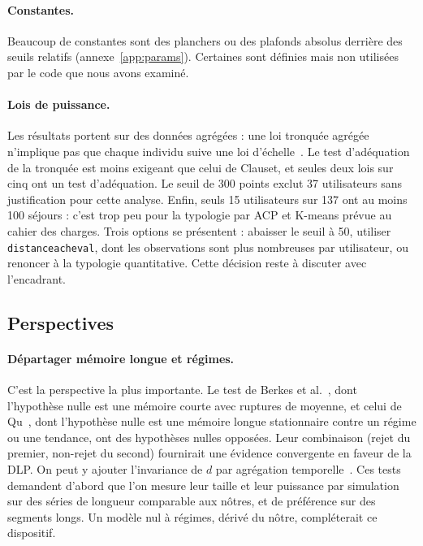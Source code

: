 \documentclass[11pt,a4paper]{article}
\newcommand{\code}[1]{\texttt{#1}}
\renewcommand{\_}{\textunderscore\penalty0\hspace{0pt}}
\begin{document}
\paragraph{Constantes.} Beaucoup de constantes sont des planchers ou des plafonds absolus
derrière des seuils relatifs (annexe~\ref{app:params}). Certaines sont définies mais non
utilisées par le code que nous avons examiné.

\paragraph{Lois de puissance.} Les résultats portent sur des données agrégées : une loi
tronquée agrégée n'implique pas que chaque individu suive une loi d'échelle~\cite{yan2013}.
Le test d'adéquation de la tronquée est moins exigeant que celui de Clauset, et seules deux
lois sur cinq ont un test d'adéquation. Le seuil de 300 points exclut 37 utilisateurs sans
justification pour cette analyse. Enfin, seuls 15 utilisateurs sur 137 ont au moins 100
séjours : c'est trop peu pour la typologie par ACP et K-means prévue au cahier des charges.
Trois options se présentent : abaisser le seuil à 50, utiliser \code{distance\_a\_cheval},
dont les observations sont plus nombreuses par utilisateur, ou renoncer à la typologie
quantitative. Cette décision reste à discuter avec l'encadrant.

\subsection{Perspectives}
\label{sec:perspectives}

\paragraph{Départager mémoire longue et régimes.} C'est la perspective la plus importante.
Le test de Berkes et al.~\cite{berkes2006}, dont l'hypothèse nulle est une mémoire courte avec
ruptures de moyenne, et celui de Qu~\cite{qu2011}, dont l'hypothèse nulle est une mémoire
longue stationnaire contre un régime ou une tendance, ont des hypothèses nulles opposées.
Leur combinaison (rejet du premier, non-rejet du second) fournirait une évidence convergente
en faveur de la DLP. On peut y ajouter l'invariance de $d$ par agrégation
temporelle~\cite{ohanissian2008}. Ces tests demandent d'abord que l'on mesure leur taille et
leur puissance par simulation sur des séries de longueur comparable aux nôtres, et de
préférence sur des segments longs. Un modèle nul à régimes, dérivé du nôtre, compléterait ce
dispositif.
\end{document}
